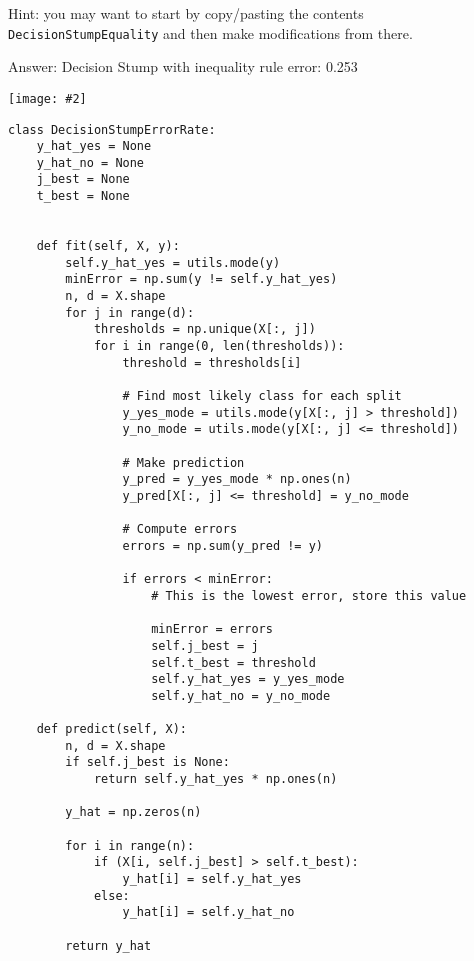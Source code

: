 \documentclass{article}
\newcommand{\gre}[1]{\textcolor{gre}{#1}}
\newcommand\ans[1]{\par\gre{Answer: #1}}
\newcommand{\centerfig}[2]{\begin{center}\texttt{[image: \#2]}\end{center}}
\begin{document}
  Hint: you may want to start by copy/pasting the contents \texttt{DecisionStumpEquality} and then make modifications from there. %
  \ans{Decision Stump with inequality rule error: 0.253}
  \centerfig{0.7}{./figs/q6_2_decisionBoundary}
  \begin{verbatim}
class DecisionStumpErrorRate:
    y_hat_yes = None
    y_hat_no = None
    j_best = None
    t_best = None


    def fit(self, X, y):
        self.y_hat_yes = utils.mode(y)
        minError = np.sum(y != self.y_hat_yes)
        n, d = X.shape
        for j in range(d):
            thresholds = np.unique(X[:, j])
            for i in range(0, len(thresholds)):
                threshold = thresholds[i]

                # Find most likely class for each split
                y_yes_mode = utils.mode(y[X[:, j] > threshold])
                y_no_mode = utils.mode(y[X[:, j] <= threshold])

                # Make prediction
                y_pred = y_yes_mode * np.ones(n)
                y_pred[X[:, j] <= threshold] = y_no_mode

                # Compute errors
                errors = np.sum(y_pred != y)

                if errors < minError:
                    # This is the lowest error, store this value
                    
                    minError = errors
                    self.j_best = j
                    self.t_best = threshold
                    self.y_hat_yes = y_yes_mode
                    self.y_hat_no = y_no_mode

    def predict(self, X):
        n, d = X.shape
        if self.j_best is None:
            return self.y_hat_yes * np.ones(n)

        y_hat = np.zeros(n)

        for i in range(n):
            if (X[i, self.j_best] > self.t_best):
                y_hat[i] = self.y_hat_yes
            else:
                y_hat[i] = self.y_hat_no
        
        return y_hat 
  \end{verbatim}
  
\end{document}
